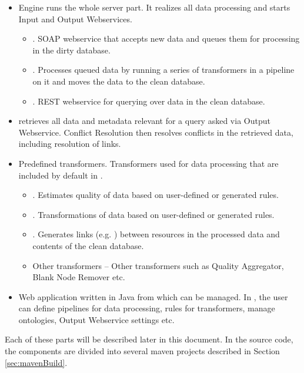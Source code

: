 \begin{itemize}
	\item {}
		Engine runs the whole server part. It realizes all data processing and starts Input and Output Webservices.

		\begin{itemize}
			\item {}. SOAP webservice that accepts new data and queues them for processing in the dirty database.
			\item {}. Processes queued data by running a series of transformers in a pipeline on it and moves the data to the clean database.
			\item {}. REST webservice for querying over data in the clean database.
		\end{itemize}
	\item {}
		\QE retrieves all data and metadata relevant for a query asked via Output Webservice. Conflict Resolution then resolves conflicts in the retrieved data, including resolution of  links.
	\item Predefined transformers.
		Transformers used for data processing that are included by default in \odcs.
		\begin{itemize}
			\item {}. Estimates quality of data based on user-defined or generated rules.
			\item {}. Transformations of data based on user-defined or generated rules.
			\item {}. Generates links (e.g. ) between resources in the processed data and contents of the clean database.
			\item Other transformers -- Other transformers such as Quality Aggregator, Blank Node Remover etc.
		\end{itemize}
	\item {}
		Web application written in Java from which \odcs can be managed. In \FE, the user can define pipelines for data processing, rules for transformers, manage ontologies, Output Webservice settings etc.
	
\end{itemize}

Each of these parts will be described later in this document. In the source code, the components are divided into several maven projects described in Section \ref{sec:mavenBuild}.

